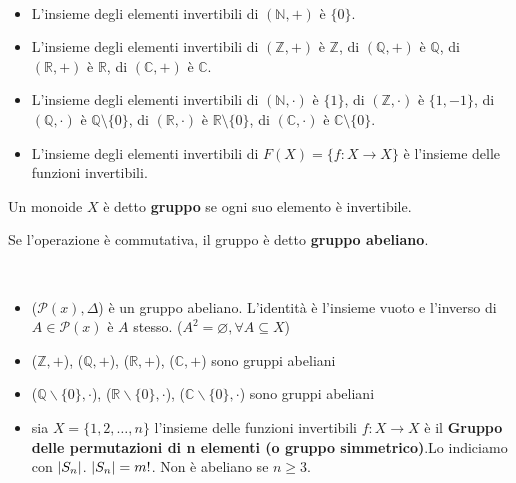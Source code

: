 \documentclass[../main.tex]{subfiles}
\begin{document}
\begin{example}
    \
    \begin{itemize}
        \item L'insieme degli elementi invertibili di $(\mathbb{N},+)$ è $\{0\}$.
        \item L'insieme degli elementi invertibili di $(\mathbb{Z},+)$ è $\mathbb{Z}$, di $(\mathbb{Q},+)$
              è $\mathbb{Q}$, di $(\mathbb{R},+)$ è $\mathbb{R}$, di $(\mathbb{C},+)$ è $\mathbb{C}$.
        \item L'insieme degli elementi invertibili di $(\mathbb{N},\cdot)$ è $\{1\}$, di $(\mathbb{Z},\cdot)$
              è $\{1,-1\}$, di $(\mathbb{Q},\cdot)$ è $\mathbb{Q} \setminus \{0\}$, di $(\mathbb{R},\cdot)$ è
              $\mathbb{R} \setminus \{0\}$, di $(\mathbb{C},\cdot)$ è $\mathbb{C} \setminus \{0\}$.
        \item L'insieme degli elementi invertibili di $F(X) = \{f: X \rightarrow X\}$ è l'insieme delle funzioni
              invertibili.
    \end{itemize}
\end{example}

\begin{definition}[Gruppo]
    Un monoide $X$ è detto \textbf{gruppo} se ogni suo elemento è invertibile.
\end{definition}
\begin{definition}
    Se l'operazione è commutativa, il gruppo è detto \textbf{gruppo abeliano}.
\end{definition}

\begin{example}
    \
    \begin{itemize}
        \item ($\mathcal{P}(x) ,\Delta $) è un gruppo abeliano. L'identità è l'insieme vuoto e l'inverso
              di $A \in \mathcal{P}(x)$ è $A$ stesso. ($A^2 = \varnothing,  \forall A \subseteq X $)
        \item ($\mathbb{Z},+$), ($\mathbb{Q},+$), ($\mathbb{R},+$), ($\mathbb{C},+$) sono gruppi abeliani
        \item ($\mathbb{Q}\backslash \{0\}, \cdot$), ($\mathbb{R}\backslash \{0\}, \cdot$),
              ($\mathbb{C}\backslash \{0\}, \cdot$) sono gruppi abeliani
        \item sia $X= \{1,2,\ldots,n\}$ l'insieme delle funzioni invertibili $f:X \rightarrow X$ è il
              \textbf{Gruppo delle permutazioni di n elementi (o gruppo simmetrico)}.Lo indiciamo con $\lvert S_n\rvert$.
              $\lvert S_n\rvert = m!$. Non è abeliano se $n \geq 3$.
    \end{itemize}
\end{example}
\end{document}
